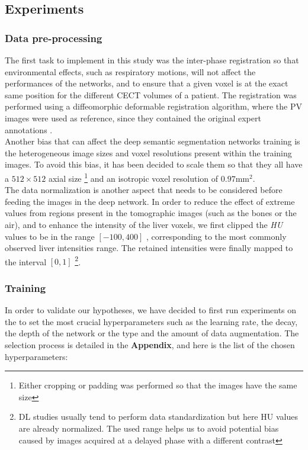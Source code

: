 \subsection{Experiments}

\subsubsection{Data pre-processing}

The first task to implement in this study was the inter-phase
registration so that environmental effects, such as respiratory motions,
will not affect the performances of the networks, and to ensure that a
given voxel is at the exact same position for the different CECT
volumes of a patient. The registration was performed using a
diffeomorphic deformable registration algorithm, where the PV
images were used as reference, since they contained the original expert
annotations \cite{Avants2008, Conze2017, Ben-Cohen, Christ2017}. \\
Another bias that can affect the deep semantic segmentation networks
training is the heterogeneous image sizes and voxel resolutions present
within the training images.
To avoid this bias, it has been decided to scale them so that they all
have a $ 512\times512 $ axial size \footnote{Either cropping or padding was performed so that the images have the same size} and an isotropic voxel resolution of $ 0.97 \text{mm}^2 $. \\
The data normalization is another aspect that needs to be considered
before feeding the images in the deep network. In order to reduce the
effect of extreme values from regions present in the tomographic images
(such as the bones or the air), and to enhance the intensity of the
liver voxels, we first clipped the \emph{HU} values to be in the range
$ \left[-100, 400\right] $ , corresponding to the most commonly 
observed liver intensities range. The retained intensities were finally mapped to
the interval $ \left[0, 1\right]$ \footnote{DL studies usually tend to perform 
data standardization but here HU values are already normalized. 
The used range helps us to avoid potential bias caused by images acquired at a delayed phase with a different contrast}.

\subsubsection{Training}

In order to validate our hypotheses, we have decided to first run
experiments on the  to set the most crucial hyperparameters
such as the learning rate, the decay, the depth of the network or the
type and the amount of data augmentation.
The selection process is detailed in the \textbf{Appendix}, and here is the list of the chosen hyperparameters:

